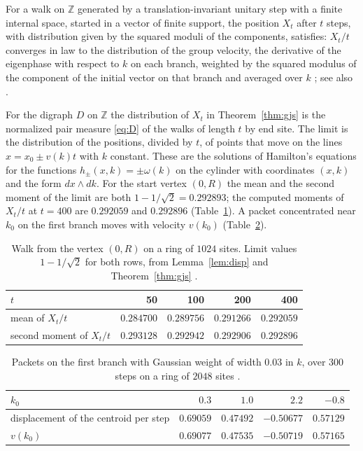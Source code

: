 \begin{theorem}\label{thm:gjs}
For a walk on $\mathbb{Z}$ generated by a translation-invariant unitary step with a finite internal space, started in a vector of finite support, the position $X_t$ after $t$ steps, with distribution given by the squared moduli of the components, satisfies: $X_t/t$ converges in law to the distribution of the group velocity, the derivative of the eigenphase with respect to $k$ on each branch, weighted by the squared modulus of the component of the initial vector on that branch and averaged over $k$ \cite{gjs}; see also \cite{suzuki}.
\end{theorem}

For the digraph $D$ on $\mathbb{Z}$ the distribution of $X_t$ in Theorem~\ref{thm:gjs} is the normalized pair measure \eqref{eq:D} of the walks of length $t$ by end site. The limit is the distribution of the positions, divided by $t$, of points that move on the lines $x=x_0\pm v(k)t$ with $k$ constant. These are the solutions of Hamilton's equations for the functions $h_\pm(x,k)=\pm\omega(k)$ on the cylinder with coordinates $(x,k)$ and the form $dx\wedge dk$. For the start vertex $(0,R)$ the mean and the second moment of the limit are both $1-1/\sqrt2=0.292893$; the computed moments of $X_t/t$ at $t=400$ are $0.292059$ and $0.292896$ (Table~\ref{tab:weak}). A packet concentrated near $k_0$ on the first branch moves with velocity $v(k_0)$ (Table~\ref{tab:packet}).

\begin{table}[ht]\centering\small
\begin{tabular}{@{}lrrrr@{}}\toprule
$t$ & 50 & 100 & 200 & 400\\\midrule
mean of $X_t/t$ & $0.284700$ & $0.289756$ & $0.291266$ & $0.292059$\\
second moment of $X_t/t$ & $0.293128$ & $0.292942$ & $0.292906$ & $0.292896$\\\bottomrule
\end{tabular}
\caption{Walk from the vertex $(0,R)$ on a ring of $1024$ sites. Limit values $1-1/\sqrt2$ for both rows, from Lemma~\ref{lem:disp} and Theorem~\ref{thm:gjs} \cite{comp3}.}\label{tab:weak}
\end{table}

\begin{table}[ht]\centering\small
\begin{tabular}{@{}lrrrr@{}}\toprule
$k_0$ & $0.3$ & $1.0$ & $2.2$ & $-0.8$\\\midrule
displacement of the centroid per step & $0.69059$ & $0.47492$ & $-0.50677$ & $0.57129$\\
$v(k_0)$ & $0.69077$ & $0.47535$ & $-0.50719$ & $0.57165$\\\bottomrule
\end{tabular}
\caption{Packets on the first branch with Gaussian weight of width $0.03$ in $k$, over $300$ steps on a ring of $2048$ sites \cite{comp3}.}\label{tab:packet}
\end{table}

